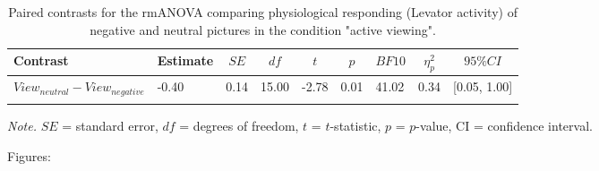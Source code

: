 \documentclass[
  english,
  man,floatsintext]{apa6}
\begin{document}
\begin{table}[H]

\begin{center}
\begin{threeparttable}

\caption{\label{tab:unnamed-chunk-6}Paired contrasts for the rmANOVA comparing physiological responding (Levator activity) of negative and neutral pictures in the condition "active viewing".}

\begin{tabular}{lllllllll}
\toprule
Contrast & \multicolumn{1}{c}{Estimate} & \multicolumn{1}{c}{$SE$} & \multicolumn{1}{c}{$df$} & \multicolumn{1}{c}{$t$} & \multicolumn{1}{c}{$p$} & \multicolumn{1}{c}{$BF10$} & \multicolumn{1}{c}{$\eta_{p}^{2}$} & \multicolumn{1}{c}{$95\% CI$}\\
\midrule
$View_{neutral} - View_{negative}$ & -0.40 & 0.14 & 15.00 & -2.78 & 0.01 & 41.02 & 0.34 & {}[0.05, 1.00]\\
\bottomrule
\addlinespace
\end{tabular}

\begin{tablenotes}[para]
\normalsize{\textit{Note.} $SE$ = standard error, $df$ = degrees of freedom, $t$ = $t$-statistic, $p$ = $p$-value, CI = confidence interval.}
\end{tablenotes}

\end{threeparttable}
\end{center}

\end{table}

Figures:
\end{document}
